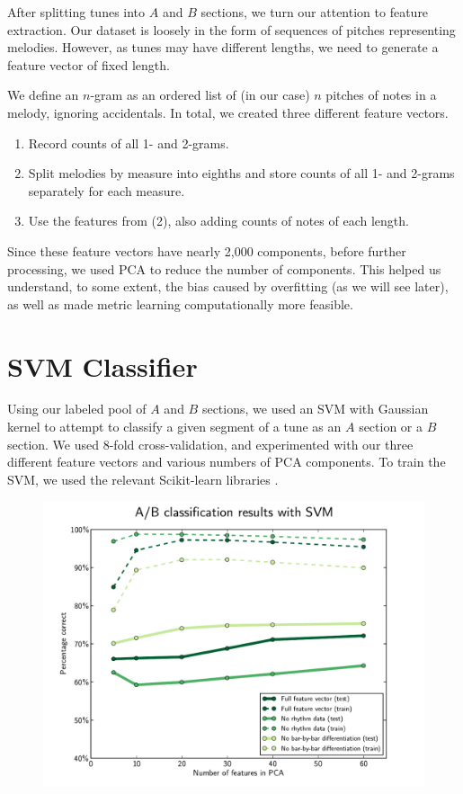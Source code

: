 \documentclass{article} %
\begin{document}
After splitting tunes into $A$ and $B$ sections, we turn our attention to
feature extraction.  Our dataset is loosely in the form of sequences of pitches
representing melodies. However, as tunes may have different lengths, we need to
generate a feature vector of fixed length.

We define an $n$-gram as an ordered list of (in our case) $n$ pitches of notes
in a melody, ignoring accidentals. In total, we created three different feature
vectors.
\begin{enumerate}
\item Record counts of all 1- and 2-grams.

\item Split melodies by measure into eighths and store counts of all 1- and
2-grams separately for each measure.

\item Use the features from (2), also adding counts of notes of each length.
\end{enumerate}

Since these feature vectors have nearly 2,000 components, before further
processing, we used PCA to reduce the number of components. This helped us
understand, to some extent, the bias caused by overfitting (as we will see
later), as well as made metric learning computationally more feasible.

\section{SVM Classifier}
Using our labeled pool of $A$ and $B$ sections, we used an SVM with Gaussian
kernel to attempt to classify a given segment of a tune as an $A$ section or a
$B$ section. We used 8-fold cross-validation, and experimented with our three
different feature vectors and various numbers of PCA components. To train the
SVM, we used the relevant Scikit-learn libraries \cite{sklearn}.


\begin{figure}
\includegraphics[width=5in]{../svm_results/svm.pdf}
\end{figure}
\end{document}
